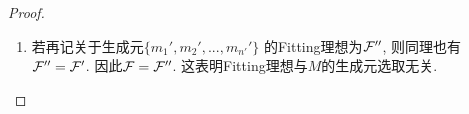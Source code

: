 \documentclass[oneside,a4papar,11pt,UTF8]{book}
\begin{document}
\begin{enumerate}[resume]
\begin{proof}
\begin{enumerate}
      对矩阵$B$适当做初等行变换,
      可将$B$化为
      $B'=
      \begin{pmatrix}
        B_1 & O \\
        B_2 & O \\
        K & I
      \end{pmatrix}$,
      易知$B_1,B_2$的每一行的前$n$列都是
      $\{m_1,m_2,...,m_n\}$的生成关系.
      由上一题知$I_B=I_{B'}$.
      而易知$B'$的$(n+n')$阶子式必为
      $\begin{pmatrix}
         B_1 \\
         B_2
       \end{pmatrix}$
      的某个$n$阶子式,因此综上有
      \[\det A'\in I_B=I_{B'}\subseteq
      I_{{B_1\choose B_2}}\subseteq \mcalF\]
      这就证明了$\mcalF'\subseteq\mcalF$.
      综上所述, $\mcalF'=\mcalF$.

      \item 若再记关于生成元$\{m_1',m_2',...,m_{n'}'\}$
      的Fitting理想为$\mathcal{F}''$,
      则同理也有$\mathcal{F}''=\mathcal{F}'$.
      因此$\mathcal{F}=\mathcal{F}''$.
      这表明Fitting理想与$M$的生成元选取无关.
    \end{enumerate}

  \end{proof}


\end{enumerate}
\end{document}
